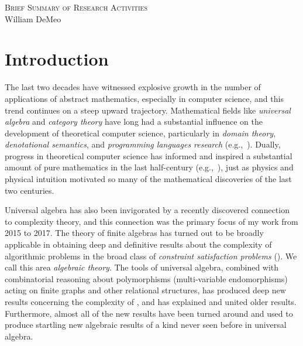 \documentclass[11pt]{amsart}
\begin{document}
\begin{center}
  \textsc{Brief Summary of Research Activities}\\[3pt]
  William DeMeo
\end{center}

\section{Introduction}
The last two decades have witnessed explosive growth in the number of applications of abstract mathematics, especially in computer science, and this trend continues on a steep upward trajectory. Mathematical fields like \emph{universal algebra} and \emph{category theory} have long had a substantial influence on the development of theoretical computer science, particularly in \emph{domain theory}, \emph{denotational semantics}, and \emph{programming languages research} (e.g.,~\cite{MR2328298,MR1006873,Plotkin2003,MR1249550}). Dually, progress in theoretical computer science has informed and inspired a substantial amount of pure mathematics in the last half-century (e.g.,~\cite{MR3233442,MR1321662,MR1249550}), just as physics and physical intuition motivated so many of the mathematical discoveries of the last two centuries.  


Universal algebra has also been invigorated by a recently discovered connection to complexity theory, and this connection was the primary focus of my work from 2015 to 2017. 
The theory of finite algebras has turned out to be broadly applicable in obtaining deep and definitive results about the complexity of algorithmic problems in the broad class of  {\it constraint satisfaction problems} (\csps).   We call this area {\it algebraic \csp theory}.
The tools of universal algebra, combined with combinatorial reasoning about polymorphisms (multi-variable endomorphisms) acting on finite graphs and other relational structures, has produced deep new results concerning the complexity of \csps, and has explained and united older results. Furthermore, almost all of the new results have been turned around and used to produce
startling new algebraic results of a kind never seen before in universal algebra.
\end{document}
